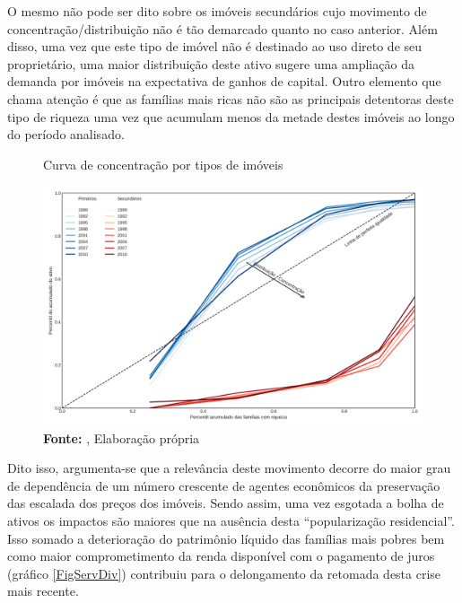 
O mesmo não pode ser dito sobre os imóveis secundários cujo movimento de concentração/distribuição não é tão demarcado quanto no caso anterior.
Além disso, uma vez que este tipo de imóvel não é destinado ao uso direto de seu proprietário, uma maior distribuição deste ativo sugere uma ampliação da demanda por imóveis na expectativa de ganhos de capital.
Outro elemento que chama atenção é que as famílias mais ricas não são as principais detentoras deste tipo de riqueza uma vez que acumulam menos da metade destes imóveis ao longo do período analisado.




\begin{figure}[H]
	\centering
	\caption{Curva de concentração por tipos de imóveis}
	\label{FigConcentracao}
	\includegraphics[width=\textwidth]{../../Dados/Fatos_Estilizados/figs/Concentracao_Imoveis.png}
	\caption*{\textbf{Fonte:} \textcite{us_census_bureau_characteristics_2017}, Elaboração própria}
\end{figure}

Dito isso, argumenta-se que a relevância deste movimento decorre do maior grau de dependência de um número crescente de agentes econômicos da preservação das escalada dos preços dos imóveis.
Sendo assim, uma vez esgotada a bolha de ativos os impactos são maiores que na ausência desta ``popularização residencial''.
Isso somado a deterioração do patrimônio líquido das famílias mais pobres bem como maior comprometimento da renda disponível com o pagamento de juros (gráfico \ref{FigServDiv}) contribuiu para o delongamento da retomada desta crise mais recente.

